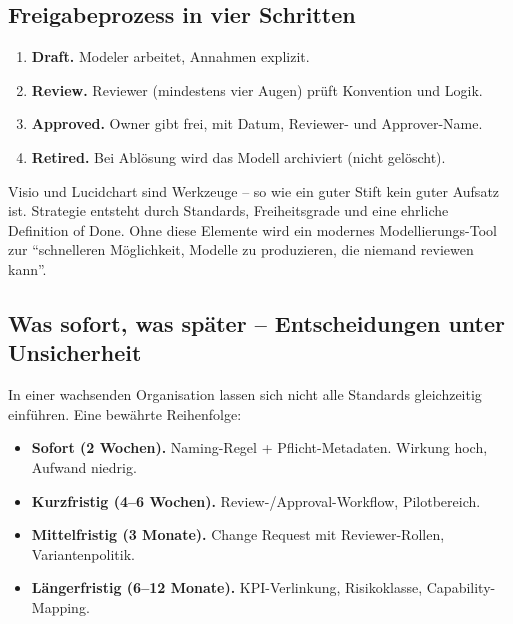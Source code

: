\documentclass[11pt,a4paper,oneside]{article}
\newcommand{\fachbegriff}[1]{\textbf{#1}}
\begin{document}
\subsection{Freigabeprozess in vier Schritten}

\begin{enumerate}
  \item \fachbegriff{Draft.} Modeler arbeitet, Annahmen explizit.
  \item \fachbegriff{Review.} Reviewer (mindestens vier Augen) prüft Konvention und Logik.
  \item \fachbegriff{Approved.} Owner gibt frei, mit Datum, Reviewer- und Approver-Name.
  \item \fachbegriff{Retired.} Bei Ablösung wird das Modell archiviert (nicht gelöscht).
\end{enumerate}

\begin{merkbox}
Visio und Lucidchart sind Werkzeuge -- so wie ein guter Stift kein guter Aufsatz ist. Strategie entsteht durch Standards, Freiheitsgrade und eine ehrliche Definition of Done. Ohne diese Elemente wird ein modernes Modellierungs-Tool zur ``schnelleren Möglichkeit, Modelle zu produzieren, die niemand reviewen kann''.
\end{merkbox}

\subsection{Was sofort, was später -- Entscheidungen unter Unsicherheit}

In einer wachsenden Organisation lassen sich nicht alle Standards gleichzeitig einführen. Eine bewährte Reihenfolge:

\begin{itemize}
  \item \textbf{Sofort (2 Wochen).} Naming-Regel + Pflicht-Metadaten. Wirkung hoch, Aufwand niedrig.
  \item \textbf{Kurzfristig (4--6 Wochen).} Review-/Approval-Workflow, Pilotbereich.
  \item \textbf{Mittelfristig (3 Monate).} Change Request mit Reviewer-Rollen, Variantenpolitik.
  \item \textbf{Längerfristig (6--12 Monate).} KPI-Verlinkung, Risikoklasse, Capability-Mapping.
\end{itemize}

\end{document}
